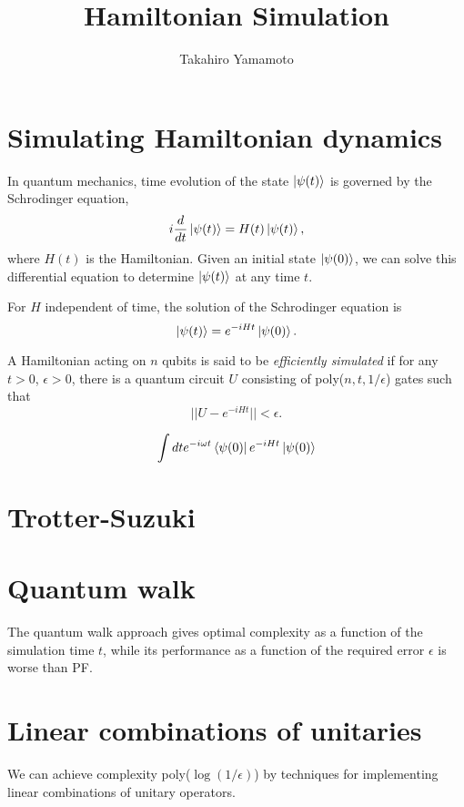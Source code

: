 \documentclass[11pt, oneside]{article}   	%
\title{Hamiltonian Simulation}
\author{Takahiro Yamamoto}
\begin{document}
\maketitle

\section{Simulating Hamiltonian dynamics}
In quantum mechanics, time evolution of the state $\ket{\psi(t)}$ is governed by the Schrodinger equation,
\begin{equation*} 
i \frac{d}{dt} \ket{\psi(t)} = H(t) \ket{\psi(t)},
\end{equation*}
where $H(t)$  is the Hamiltonian.
Given an initial state $\ket{\psi(0)}$, we can solve this differential equation to determine $\ket{\psi(t)}$ at any time $t$.

For $H$ independent of time, the solution of the Schrodinger equation is
\begin{equation*} 
\ket{\psi(t)} = e^{-i H t} \ket{\psi(0)}.
\end{equation*}

A Hamiltonian acting on $n$ qubits is said to be \textit{efficiently simulated} if for any $t > 0$, $\epsilon > 0$, there is a quantum circuit $U$ consisting of poly($n, t, 1/\epsilon$) gates such that
\begin{equation*} 
||U - e^{-iHt}  || < \epsilon.
\end{equation*}

\begin{equation*} 
\int dt e^{-i \omega t} \bra{\psi(0)} e^{-i H t} \ket{\psi(0)}
\end{equation*}

\section{Trotter-Suzuki}
\section{Quantum walk}
The quantum walk approach gives optimal complexity as a function of the simulation time $t$, while its performance as a function of the required error $\epsilon$ is worse than PF.

\section{Linear combinations of unitaries}
We can achieve complexity poly($\log(1/\epsilon)$) by techniques for implementing linear combinations of unitary operators.
\end{document}
